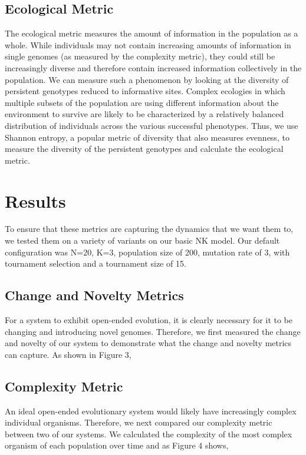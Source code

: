 \documentclass[letterpaper]{article}
\begin{document}
\subsection{Ecological Metric}
    The ecological metric measures the amount of information in the population as a whole. While individuals may not contain increasing amounts of information in single genomes (as measured by the complexity metric), they could still be increasingly diverse and therefore contain increased information collectively in the population. We can measure such a phenomenon by looking at the diversity of persistent genotypes reduced to informative sites. Complex ecologies in which multiple subsets of the population are using different information about the environment to survive are likely to be characterized by a relatively balanced distribution of individuals across the various successful phenotypes. Thus, we use Shannon entropy, a popular metric of diversity that also measures evenness, to measure the diversity of the persistent genotypes and calculate the ecological metric.



\section{Results}
    To ensure that these metrics are capturing the dynamics that we want them to, we tested them on a variety of variants on our basic NK model. Our default configuration was N=20, K=3, population size of 200, mutation rate of 3, with tournament selection and a tournament size of 15.


\subsection{Change and Novelty Metrics}
For a system to exhibit open-ended evolution, it is clearly necessary for it to be changing and introducing novel genomes. Therefore, we first measured the change and novelty of our system to demonstrate what the change and novelty metrics can capture. As shown in Figure 3,

\subsection{Complexity Metric}
    An ideal open-ended evolutionary system would likely have increasingly complex individual organisms. Therefore, we next compared our complexity metric between two of our systems. We calculated the complexity of the most complex organism of each population over time and as Figure 4 shows,
\end{document}
